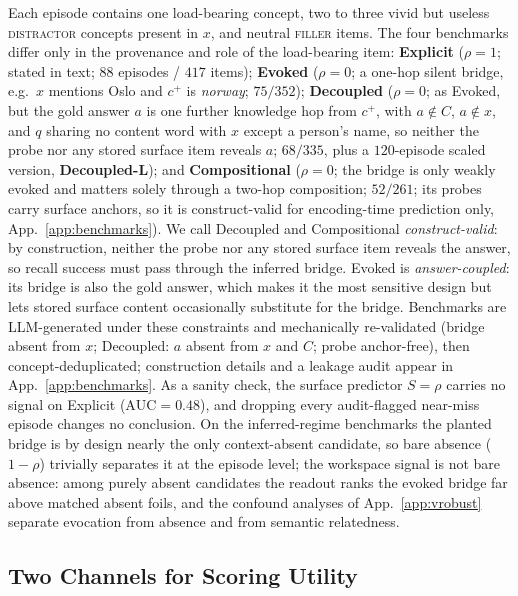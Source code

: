 Each episode contains one load-bearing concept, two to three vivid but useless
\textsc{distractor} concepts present in $x$, and neutral \textsc{filler} items.
The four benchmarks differ only in the provenance and role of the load-bearing
item:
\textbf{Explicit} ($\rho{=}1$; stated in text; $88$ episodes / $417$ items);
\textbf{Evoked} ($\rho{=}0$; a one-hop silent bridge, e.g.\ $x$ mentions Oslo
and $c^{+}$ is \emph{norway}; $75/352$);
\textbf{Decoupled} ($\rho{=}0$; as Evoked, but the gold answer $a$ is one
further knowledge hop from $c^{+}$, with $a \notin C$, $a \notin x$, and $q$
sharing no content word with $x$ except a person's name, so neither the probe
nor any stored surface item reveals $a$; $68/335$, plus a $120$-episode scaled
version, \textbf{Decoupled-L}); and
\textbf{Compositional} ($\rho{=}0$; the bridge is only weakly evoked and
matters solely through a two-hop composition; $52/261$; its probes carry
surface anchors, so it is construct-valid for encoding-time prediction only,
App.~\ref{app:benchmarks}).
We call Decoupled and Compositional \emph{construct-valid}: by construction,
neither the probe nor any stored surface item reveals the answer, so recall
success must pass through the inferred bridge. Evoked is
\emph{answer-coupled}: its bridge is also the gold answer, which makes it the
most sensitive design but lets stored surface content occasionally substitute
for the bridge.
Benchmarks are LLM-generated under these constraints and mechanically
re-validated (bridge absent from $x$; Decoupled: $a$ absent from $x$ and $C$;
probe anchor-free), then concept-deduplicated; construction details and a
leakage audit appear in App.~\ref{app:benchmarks}. As a sanity check, the
surface predictor $S{=}\rho$ carries no signal on Explicit
($\mathrm{AUC}{=}0.48$), and dropping every audit-flagged near-miss episode
changes no conclusion. On the inferred-regime benchmarks the planted bridge
is by design nearly the only context-absent candidate, so bare absence
($1{-}\rho$) trivially separates it at the episode level; the workspace
signal is not bare absence: among purely absent candidates the readout ranks
the evoked bridge far above matched absent foils, and the confound analyses
of App.~\ref{app:vrobust} separate evocation from absence and from semantic
relatedness.

\subsection{Two Channels for Scoring Utility}
\label{sec:channels}

